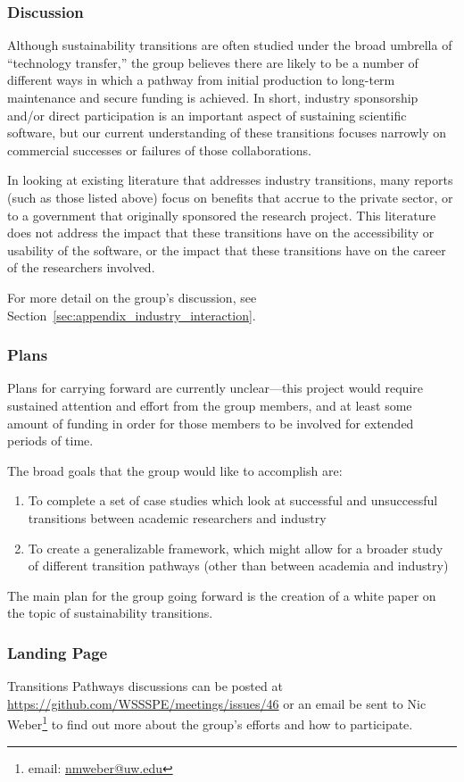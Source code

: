 \subsubsection{Discussion}

Although sustainability transitions are often studied under the broad umbrella
of ``technology transfer,'' the group believes there are likely to be a number of
different ways in which a pathway from initial production to long-term
maintenance and secure funding is achieved. In short, industry sponsorship
and/or direct participation is an important aspect of sustaining scientific
software, but our current understanding of these transitions focuses narrowly on
commercial successes or failures of those collaborations.

In looking at existing literature that addresses industry transitions, many
reports (such as those listed above) focus on benefits that accrue to the
private sector, or to a government that originally sponsored the research
project. This literature does not address the impact that these transitions have
on the accessibility or usability of the software, or the impact that these
transitions have on the career of the researchers involved.

For more detail on the group's discussion, see
Section~\ref{sec:appendix_industry_interaction}.

\subsubsection{Plans}

Plans for carrying forward are currently unclear---this project would require
sustained attention and effort from the group members, and at least some amount of
funding in order for those members to be involved for extended periods of time.

The broad goals that the group would like to accomplish are: 

\begin{enumerate}

\item To complete a set of case studies which look at successful and
unsuccessful transitions between academic researchers and industry

\item To create a generalizable framework, which might allow for a broader study
of different transition pathways (other than between academia and industry)

\end{enumerate}

The main plan for the group going forward is the creation of a white paper on
the topic of sustainability transitions.

\subsubsection{Landing Page}

Transitions Pathways discussions can be posted at
\url{https://github.com/WSSSPE/meetings/issues/46} or an email be sent to Nic
Weber\footnote{email: \href{mailto:nmweber@uw.edu}{nmweber@uw.edu}} to find out
more about the group's efforts and how to participate.
